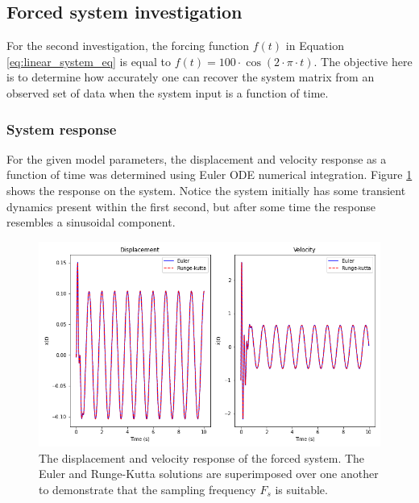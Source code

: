 \documentclass{article}
\begin{document}
\subsection{Forced system investigation}
For the second investigation, the forcing function $f(t)$ in Equation \eqref{eq:linear_system_eq} is equal to $f(t) = 100\cdot \cos \left( 2\cdot \pi \cdot t \right)$. The objective here is to determine how accurately one can recover the system matrix from an observed set of data when the system input is a function of time. 

\subsubsection{System response}
For the given model parameters, the displacement and velocity response as a function of time was determined using Euler ODE numerical integration. Figure \ref{fig:Q4b_1} shows the response on the system. Notice the system initially has some transient dynamics present within the first second, but after some time the response resembles a sinusoidal component. 
\begin{figure}
    \centering
    \includegraphics[scale = 0.5]{Q4b_fig1.png}
    \caption{The displacement and velocity response of the forced system. The Euler and Runge-Kutta solutions are superimposed over one another to demonstrate that the sampling frequency $F_s$ is suitable.}
    \label{fig:Q4b_1}
\end{figure}
\end{document}
